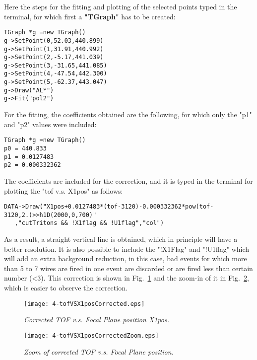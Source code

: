 \documentclass[11pt]{report}
\begin{document}
\noindent
Here the steps for the fitting and plotting of the selected points typed in 
the terminal, for which first a \textbf{"TGraph"} has to be created:
\begin{verbatim}
TGraph *g =new TGraph()
g->SetPoint(0,52.03,440.899)
g->SetPoint(1,31.91,440.992)
g->SetPoint(2,-5.17,441.039)
g->SetPoint(3,-31.65,441.085)
g->SetPoint(4,-47.54,442.300)
g->SetPoint(5,-62.37,443.047)
g->Draw("AL*")
g->Fit("pol2") 
\end{verbatim}

\noindent
For the fitting, the coefficients obtained are the following, 
for which only the "p1" and "p2" values were included:
\begin{verbatim}
TGraph *g =new TGraph()
p0 = 440.833
p1 = 0.0127483
p2 = 0.000332362
\end{verbatim}

\noindent
The coefficients are included for the correction, and it is typed in the terminal for 
plotting the "tof v.s. X1pos" as follows:
\begin{verbatim}
DATA->Draw("X1pos+0.0127483*(tof-3120)-0.000332362*pow(tof-3120,2.)>>h1D(2000,0,700)"
   ,"cutTritons && !X1flag && !U1flag","col")
\end{verbatim}

\noindent 
As a result, a straight vertical line is obtained, which in principle will have a better 
resolution. It is also possible
to include the "!X1Flag" and "!U1flag" which will add an extra background reduction, 
in this case, bad events for which more than 5 to 7 wires
are fired in one event are discarded or are fired less than certain number (\textless 3). 
This correction is shown in Fig.~\ref{fig:tofVSX1posCorrected}
and the zoom-in of it in Fig.~\ref{fig:tofVSX1posCorrectedZoom}, which is easier to observe the correction.

\begin{figure}[h]
 \begin{center}
\texttt{[image: 4-tofVSX1posCorrected.eps]}  
 \end{center}
\vspace*{-4mm}
\caption{\label{fig:tofVSX1posCorrected} \it Corrected TOF v.s. Focal Plane position X1pos.}
\end{figure}
\vspace*{4mm}

\begin{figure}[h]
 \begin{center}
\texttt{[image: 4-tofVSX1posCorrectedZoom.eps]}  
 \end{center}
\vspace*{-4mm}
\caption{\label{fig:tofVSX1posCorrectedZoom} \it Zoom of corrected TOF v.s. Focal Plane position.}
\end{figure}
\vspace*{4mm}
\end{document}
